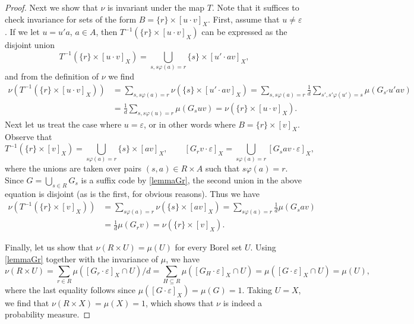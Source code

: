 \documentclass[a4paper,UKenglish,numberwithinsect,cleveref]{lipics-v2021}
\begin{document}
\begin{proof}
    Next we show that $\nu$ is invariant under the map $T$. Note that it suffices to check invariance for sets of the form $B = \{r\}\times [u\cdot v]_X$. First, assume that $u\neq\varepsilon$. If we let $u = u'a$, $a\in A$, then $T^{-1}(\{r\}\times[u\cdot v]_X)$ can be expressed as the disjoint union
    \[
        T^{-1}(\{r\}\times[u\cdot v]_X) = \bigcup_{s,s\varphi(a)=r} \{s\}\times[u'\cdot av]_X,
    \]
    and from the definition of $\nu$ we find
    \begin{align*}
        \nu(T^{-1}(\{r\}\times[u\cdot v]_X)) 
        &= \sum_{s,s\varphi(a)=r}\nu(\{s\}\times[u'\cdot av]_X) 
        = \sum_{s,s\varphi(a)=r}\frac1d\sum_{s',s'\varphi(u')=s}\mu(G_{s'}u'av) \\
        &= \frac1d\sum_{s,s\varphi(u)=r}\mu(G_{s}uv) = \nu(\{r\}\times[u\cdot v]_X).
    \end{align*}
    Next let us treat the case where $u=\varepsilon$, or in other words where $B = \{r\}\times[v]_X$. Observe that 
    \[
        T^{-1}(\{r\}\times[v]_X)=\bigcup_{s\varphi(a)=r}\{s\}\times [av]_X, \qquad [G_rv\cdot \varepsilon]_X = \bigcup_{s\varphi(a)=r}[G_sav\cdot \varepsilon]_X,
    \]
    where the unions are taken over pairs $(s,a)\in R\times A$ such that $s\varphi(a)=r$. Since $G=\bigcup_{s\in R}G_s$ is a suffix code by \cref{lemmaGr}, the second union in the above equation is disjoint (as is the first, for obvious reasons). Thus we have
    \begin{align*}
        \nu(T^{-1}(\{r\}\times [v]_X))&=\sum_{s\varphi(a)=r}\nu(\{s\}\times[av]_X)=\sum_{s\varphi(a)=r}\frac1d\mu(G_sav)\\
                                    &=\frac1d\mu(G_rv)=\nu(\{r\}\times[v]_X). 
    \end{align*}

    Finally, let us show that $\nu(R\times U) = \mu(U)$ for every Borel set $U$. Using \cref{lemmaGr} together with the invariance of $\mu$, we have
    \begin{equation*}
        \nu(R\times U) = \sum_{r\in R}\mu([G_r\cdot \varepsilon]_X\cap U)/d = \sum_{H\subseteq R}\mu([G_H\cdot \varepsilon]_X\cap U) = \mu([G\cdot\varepsilon]_X\cap U) = \mu(U),
    \end{equation*}
    where the last equality follows since $\mu([G\cdot\varepsilon]_X) = \mu(G) = 1$. Taking $U=X$, we find that $\nu(R\times X)=\mu(X)=1$, which shows that $\nu$ is indeed a probability measure.
\end{proof}
\end{document}
